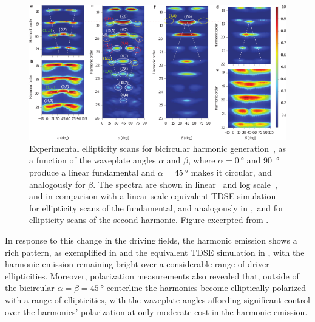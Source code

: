 \begin{figure}[ht]
  \centering
  \subfloat{\label{f8-fleischer-ellipticity-scan-a}}
  \subfloat{\label{f8-fleischer-ellipticity-scan-b}}
  \subfloat{\label{f8-fleischer-ellipticity-scan-c}}
  \subfloat{\label{f8-fleischer-ellipticity-scan-d}}
  \subfloat{\label{f8-fleischer-ellipticity-scan-e}}
  \subfloat{\label{f8-fleischer-ellipticity-scan-f}}
  \includegraphics[width=\textwidth]{8-Spin-HHG/Figures/figure8G.png}
  \caption[
  Experimental ellipticity scans on the drivers for bicircular HHG, as observed by A. Fleischer~et~al.
  ]{
  Experimental ellipticity scans for bicircular harmonic generation~\cite{fleischer_spin_2014}, as a function of the waveplate angles $\alpha$ and $\beta$, where $\alpha=\SI{0}{\degree}$ and \SI{90}{\degree} produce a linear fundamental and $\alpha=\SI{45}{\degree}$ makes it circular, and analogously for $\beta$. The spectra are shown in linear~\protect{} and log scale~\protect{}, and in comparison with a linear-scale equivalent TDSE simulation~\protect{} for ellipticity scans of the fundamental, and analogously in \protect{},\,\protect{} and \protect{} for ellipticity scans of the second harmonic.
  Figure excerpted from .
  }
  \label{f8-fleischer-ellipticity-scan}
\end{figure}



In response to this change in the driving fields, the harmonic emission shows a rich pattern, as exemplified in  and the equivalent TDSE simulation in , with the harmonic emission remaining bright over a considerable range of driver ellipticities. Moreover, polarization measurements also revealed that, outside of the bicircular $\alpha=\beta=\SI{45}{\degree}$ centerline the harmonics become elliptically polarized with a range of ellipticities, with the waveplate angles affording significant control over the harmonics' polarization at only moderate cost in the harmonic emission.


